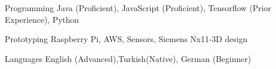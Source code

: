 

\begin{cvskills}

  \cvskill
    {Programming} %
    {Java (Proficient), JavaScript (Proficient), Tensorflow (Prior Experience), Python} %

  \cvskill
    {Prototyping} %
    {Raspberry Pi, AWS, Sensors, Siemens Nx11-3D design} %

  \cvskill
    {Languages} %
    {English (Advanced),Turkish(Native), German (Beginner)} %

\end{cvskills}
